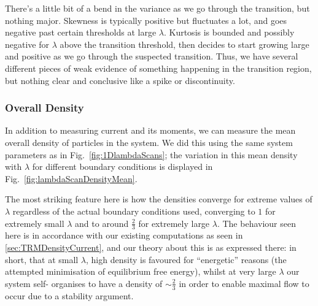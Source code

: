 There's a little bit of a bend in the variance as we go through the transition, but nothing major.
Skewness is typically positive but fluctuates a lot, and goes negative past certain thresholds at
large $\lambda$. Kurtosis is bounded and possibly negative for $\lambda$ above the transition threshold,
then decides to start growing large and positive as we go through the suspected transition.
Thus, we have several different pieces of weak evidence of something happening in the transition region,
but nothing clear and conclusive like a spike or discontinuity.


\subsubsection{Overall Density}

In addition to measuring current and its moments, we can measure the mean overall density of particles in
the system. We did this using the same system parameters as in Fig.~\ref{fig:1DlambdaScans}; the 
variation in this mean density with $\lambda$ for different boundary conditions is displayed in 
Fig.~\ref{fig:lambdaScanDensityMean}.

The most striking feature here is how the densities converge for extreme values of $\lambda$
regardless of the actual boundary conditions used, converging to $1$ for extremely small $\lambda$ and to
around $\frac{2}{3}$ for extremely large $\lambda$. The behaviour seen here is in accordance with our 
existing computations as seen in \ref{sec:TRMDensityCurrent}, and our theory about this is as expressed 
there: in short, that at small $\lambda$, high density is favoured for ``energetic'' reasons (the
attempted minimisation of equilibrium  free energy), whilst at very large $\lambda$  our system self-
organises to have a density of $\sim \frac{2}{3}$ in order to enable maximal flow to occur due to a
stability argument.

